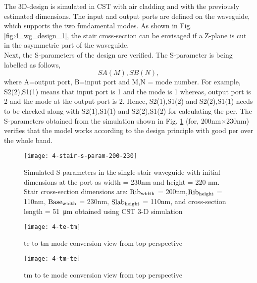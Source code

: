\documentclass[../report.tex]{subfiles}
\begin{document}
\noindent The 3D-design is simulated in CST with air cladding and with the previously estimated dimensions. The input and output ports are defined on the waveguide, which supports the two fundamental modes. As shown in Fig. \ref{fig:4_wg_design_1}, the stair cross-section can be envisaged if a Z-plane is cut in the asymmetric part of the waveguide.\\

\noindent Next, the S-parameters of the design are verified. The S-parameter is being labelled as follows,
\begin{equation}\label{eq:s_parameter_label}
SA(M),SB(N),
\end{equation}
where A=output port, B=input port and M,N = mode number. For example, S2(2),S1(1) means that input port is 1 and the mode is 1 whereas, output port is 2 and the mode at the output port is 2. Hence, S2(1),S1(2) and S2(2),S1(1) needs to be checked along with S2(1),S1(1) and S2(2),S1(2) for calculating the \gls{per}. The S-parameters obtained from the simulation shown in Fig. \ref{fig:4_stair_s_param_200_230} (for, 200nm$\times$230nm) verifies that the model works according to the design principle with good \gls{per} over the whole band. 


\begin{figure}[H] %
	\centering
	\texttt{[image: 4-stair-s-param-200-230]}
	\caption{Simulated S-parameters in the single-stair waveguide with initial dimensions at the port as width = 230nm and height = 220 nm. Stair cross-section dimensions are: $\mathrm{Rib_{width}}$ = 200nm,$\mathrm{Rib_{height}}$ = 110nm, $\mathrm{Base_{width}}$ = 230nm, $\mathrm{Slab_{height}}$ = 110nm, and cross-section length = \SI{51}{\micro\meter} obtained using CST 3-D simulation}
	\label{fig:4_stair_s_param_200_230}
\end{figure}

\begin{figure}[H] %
	\centering
	\texttt{[image: 4-te-tm]}
	\caption{\gls{te} to \gls{tm} mode conversion view from top perspective}
	\label{fig:4_te_tm}
\end{figure}

\begin{figure}[H] %
	\centering
	\texttt{[image: 4-tm-te]}
	\caption{\gls{tm} to \gls{te} mode conversion view from top perspective}
	\label{fig:4_tm_te}
\end{figure}
\end{document}

